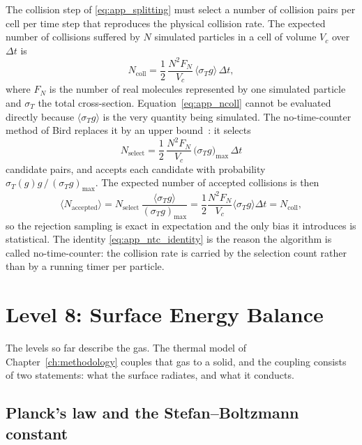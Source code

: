 The collision step of \eqref{eq:app_splitting} must select a number of collision pairs per cell per time step that reproduces the physical collision rate. The expected number of collisions suffered by $N$ simulated particles in a cell of volume $V_c$ over $\Delta t$ is
\begin{equation}
    N_{\mathrm{coll}} = \frac{1}{2}\,\frac{N^2F_N}{V_c}\,\bigl\langle\sigma_T g\bigr\rangle\,\Delta t ,
    \label{eq:app_ncoll}
\end{equation}
where $F_N$ is the number of real molecules represented by one simulated particle and $\sigma_T$ the total cross-section. Equation~\eqref{eq:app_ncoll} cannot be evaluated directly because $\langle\sigma_T g\rangle$ is the very quantity being simulated. The no-time-counter method of Bird replaces it by an upper bound~\cite{bird1994molecular}: it selects
\begin{equation}
    N_{\mathrm{select}} = \frac{1}{2}\,\frac{N^2F_N}{V_c}\,\bigl(\sigma_T g\bigr)_{\max}\,\Delta t
    \label{eq:app_nselect}
\end{equation}
candidate pairs, and accepts each candidate with probability $\sigma_T(g)g\,/\,(\sigma_T g)_{\max}$. The expected number of accepted collisions is then
\begin{equation}
    \bigl\langle N_{\mathrm{accepted}}\bigr\rangle = N_{\mathrm{select}}\,\frac{\langle\sigma_T g\rangle}{(\sigma_T g)_{\max}} = \frac{1}{2}\frac{N^2F_N}{V_c}\langle\sigma_T g\rangle\Delta t = N_{\mathrm{coll}} ,
    \label{eq:app_ntc_identity}
\end{equation}
so the rejection sampling is exact in expectation and the only bias it introduces is statistical. The identity \eqref{eq:app_ntc_identity} is the reason the algorithm is called no-time-counter: the collision rate is carried by the selection count rather than by a running timer per particle.

\section{Level 8: Surface Energy Balance}
\label{app:surface}

The levels so far describe the gas. The thermal model of Chapter~\ref{ch:methodology} couples that gas to a solid, and the coupling consists of two statements: what the surface radiates, and what it conducts.

\subsection{Planck's law and the Stefan--Boltzmann constant}

